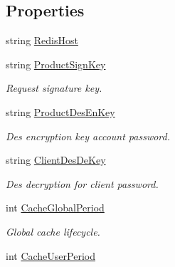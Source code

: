 \subsection*{Properties}
\begin{DoxyCompactItemize}
\item 
string \mbox{\hyperlink{class_t_net_1_1_runtime_1_1_zone_setting_ad50485686e3ac80ba79b74d8608b9b05}{Redis\+Host}}
\item 
string \mbox{\hyperlink{class_t_net_1_1_runtime_1_1_zone_setting_a628d79b431e8e2d2f2dae22e6e1cfc99}{Product\+Sign\+Key}}
\begin{DoxyCompactList}\small\item\em Request signature key. \end{DoxyCompactList}\item 
string \mbox{\hyperlink{class_t_net_1_1_runtime_1_1_zone_setting_a324f2974597e9c745169c9de4e00b9d9}{Product\+Des\+En\+Key}}
\begin{DoxyCompactList}\small\item\em Des encryption key account password. \end{DoxyCompactList}\item 
string \mbox{\hyperlink{class_t_net_1_1_runtime_1_1_zone_setting_a48292d88e7e34cf13ea40139b21f4aed}{Client\+Des\+De\+Key}}
\begin{DoxyCompactList}\small\item\em Des decryption for client password. \end{DoxyCompactList}\item 
int \mbox{\hyperlink{class_t_net_1_1_runtime_1_1_zone_setting_a6ce3639d9fd54a373ec4755a81c48f75}{Cache\+Global\+Period}}
\begin{DoxyCompactList}\small\item\em Global cache lifecycle. \end{DoxyCompactList}\item 
int \mbox{\hyperlink{class_t_net_1_1_runtime_1_1_zone_setting_a865d8c064722f93244a7c562c284e883}{Cache\+User\+Period}}

\end{DoxyCompactItemize}
